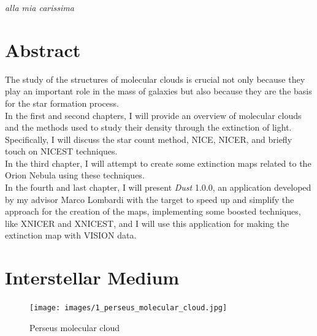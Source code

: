 \documentclass[a4paper,11pt,twoside]{book}
\begin{document}



\cleardoublepage\thispagestyle{empty} 
\vspace*{1cm} 
\textit{
\flushright
alla mia carissima
\vfill
}



\chapter*{\centering Abstract}






The study of the structures of molecular clouds is crucial not only because they play an important role in the mass of galaxies but also because they are the basis for the star formation process. \\

In the first and second chapters, I will provide an overview of molecular clouds and the methods used to study their density through the extinction of light. Specifically, I will discuss the star count method, NICE, NICER, and briefly touch on NICEST techniques.\\

In the third chapter, I will attempt to create some extinction maps related to the Orion Nebula using these techniques. \\

In the fourth and last chapter, I will present \textit{Dust} 1.0.0, an application developed by my advisor Marco Lombardi with the target to speed up and simplify the approach for the creation of the maps, implementing some boosted techniques, like XNICER and XNICEST, and I will use this application for making the extinction map with VISION data.



\newpage\null\thispagestyle{empty}\newpage
\tableofcontents
\newpage\null\thispagestyle{empty}\newpage

\mainmatter

\chapter{Interstellar Medium}

\begin{figure}[H]
	\centering
	\texttt{[image: images/1\_perseus\_molecular\_cloud.jpg]}
	\caption{Perseus molecular cloud}
	\label{fig:image}
\end{figure}
\end{document}
